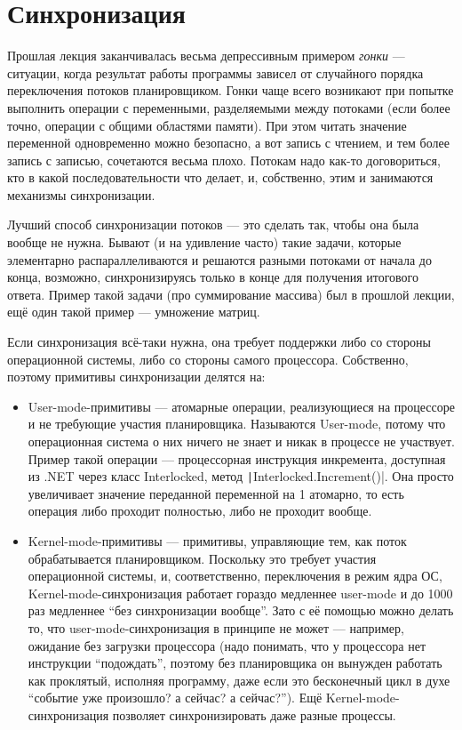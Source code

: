 \documentclass{../../text-style}
\begin{document}
\maketitle
\thispagestyle{empty}

\section{Синхронизация}

Прошлая лекция заканчивалась весьма депрессивным примером \textit{гонки} --- ситуации, когда результат работы программы зависел от случайного порядка переключения потоков планировщиком. Гонки чаще всего возникают при попытке выполнить операции с переменными, разделяемыми между потоками (если более точно, операции с общими областями памяти). При этом читать значение переменной одновременно можно безопасно, а вот запись с чтением, и тем более запись с записью, сочетаются весьма плохо. Потокам надо как-то договориться, кто в какой последовательности что делает, и, собственно, этим и занимаются механизмы синхронизации.

Лучший способ синхронизации потоков --- это сделать так, чтобы она была вообще не нужна. Бывают (и на удивление часто) такие задачи, которые элементарно распараллеливаются и решаются разными потоками от начала до конца, возможно, синхронизируясь только в конце для получения итогового ответа. Пример такой задачи (про суммирование массива) был в прошлой лекции, ещё один такой пример --- умножение матриц.

Если синхронизация всё-таки нужна, она требует поддержки либо со стороны операционной системы, либо со стороны самого процессора. Собственно, поэтому примитивы синхронизации делятся на:

\begin{itemize}
    \item User-mode-примитивы --- атомарные операции, реализующиеся на процессоре и не требующие участия планировщика. Называются User-mode, потому что операционная система о них ничего не знает и никак в процессе не участвует. Пример такой операции --- процессорная инструкция инкремента, доступная из .NET через класс Interlocked, метод \texttt|Interlocked.Increment()|. Она просто увеличивает значение переданной переменной на 1 атомарно, то есть операция либо проходит полностью, либо не проходит вообще.
    \item Kernel-mode-примитивы --- примитивы, управляющие тем, как поток обрабатывается планировщиком. Поскольку это требует участия операционной системы, и, соответственно, переключения в режим ядра ОС, Kernel-mode-синхронизация работает гораздо медленнее user-mode и до 1000 раз медленнее \enquote{без синхронизации вообще}. Зато с её помощью можно делать то, что user-mode-синхронизация в принципе не может --- например, ожидание без загрузки процессора (надо понимать, что у процессора нет инструкции \enquote{подождать}, поэтому без планировщика он вынужден работать как проклятый, исполняя программу, даже если это бесконечный цикл в духе \enquote{событие уже произошло? а сейчас? а сейчас?}). Ещё Kernel-mode-синхронизация позволяет синхронизировать даже разные процессы.
\end{itemize}
\end{document}

